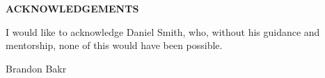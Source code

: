 \clearpage
\begin{centering}
\textbf{ACKNOWLEDGEMENTS}\\
\vspace{\baselineskip}
\end{centering}

I would like to acknowledge Daniel Smith, who, without his
guidance and mentorship, none of this would have been possible.

Brandon Bakr

\clearpage
